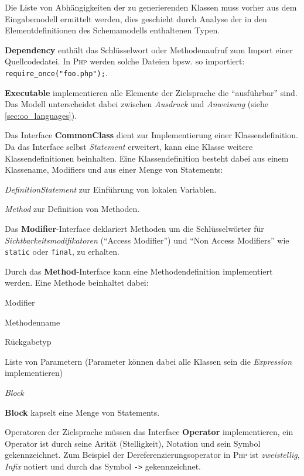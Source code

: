 Die Liste von Abhängigkeiten der zu generierenden Klassen muss vorher aus dem Eingabemodell ermittelt werden, dies geschieht durch Analyse der in den Elementdefinitionen des Schemamodells enthaltenen Typen. 

\textbf{Dependency} enthält das Schlüsselwort oder Methodenaufruf zum Import einer Quellcodedatei. In \textsc{Php} werden solche Dateien bpsw. so importiert: \texttt{require\_once("foo.php");}.

\textbf{Executable} implementieren alle Elemente der Zielsprache die \enquote{ausführbar} sind. Das Modell unterscheidet dabei zwischen \emph{Ausdruck} und \emph{Anweisung} (siehe \cref{sec:oo_languages}). 

Das Interface \textbf{CommonClass} dient zur Implementierung einer Klassendefinition. Da das Interface selbst \emph{Statement} erweitert, kann eine Klasse weitere Klassendefinitionen beinhalten. Eine Klassendefinition besteht dabei aus einem Klassename, Modifiers und aus einer Menge von Statements:
\begin{compactitem}
    \item \emph{DefinitionStatement} zur Einführung von lokalen Variablen.
    \item \emph{Method} zur Definition von Methoden.
\end{compactitem}

Das \textbf{Modifier}-Interface deklariert Methoden um die Schlüsselwörter für \emph{Sichtbarkeitsmodifikatoren} (\enquote{Access Modifier}) und \enquote{Non Access Modifiers} wie \texttt{static} oder \texttt{final}, zu erhalten.

Durch das \textbf{Method}-Interface kann eine Methodendefinition implementiert werden. Eine Methode beinhaltet dabei:
\begin{compactitem}
    \item Modifier
    \item Methodenname
    \item Rückgabetyp
    \item Liste von Parametern (Parameter können dabei alle Klassen sein die \emph{Expression} implementieren) %
    \item \emph{Block}
\end{compactitem}

\textbf{Block} kapselt eine Menge von Statements.

Operatoren der Zielsprache müssen das Interface \textbf{Operator} implementieren, ein Operator ist durch seine Arität (Stelligkeit), Notation und sein Symbol gekennzeichnet. Zum Beispiel der Dereferenzierungsoperator in \textsc{Php} ist \emph{zweistellig}, \emph{Infix} notiert und durch das Symbol \texttt{->} gekennzeichnet.

